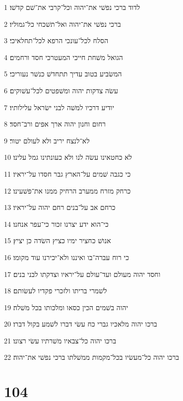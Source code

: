 \par 1 לדוד ברכי נפשׁי את־יהוה וכל־קרבי את־שׁם קדשׁו׃
\par 2 ברכי נפשׁי את־יהוה ואל־תשׁכחי כל־גמוליו׃
\par 3 הסלח לכל־עונכי הרפא לכל־תחלאיכי׃
\par 4 הגואל משׁחת חייכי המעטרכי חסד ורחמים׃
\par 5 המשׂביע בטוב עדיך תתחדשׁ כנשׁר נעוריכי׃
\par 6 עשׂה צדקות יהוה ומשׁפטים לכל־עשׁוקים׃
\par 7 יודיע דרכיו למשׁה לבני ישׂראל עלילותיו׃
\par 8 רחום וחנון יהוה ארך אפים ורב־חסד׃
\par 9 לא־לנצח יריב ולא לעולם יטור׃
\par 10 לא כחטאינו עשׂה לנו ולא כעונתינו גמל עלינו׃
\par 11 כי כגבה שׁמים על־הארץ גבר חסדו על־יראיו׃
\par 12 כרחק מזרח ממערב הרחיק ממנו את־פשׁעינו׃
\par 13 כרחם אב על־בנים רחם יהוה על־יראיו׃
\par 14 כי־הוא ידע יצרנו זכור כי־עפר אנחנו׃
\par 15 אנושׁ כחציר ימיו כציץ השׂדה כן יציץ׃
\par 16 כי רוח עברה־בו ואיננו ולא־יכירנו עוד מקומו׃
\par 17 וחסד יהוה מעולם ועד־עולם על־יראיו וצדקתו לבני בנים׃
\par 18 לשׁמרי בריתו ולזכרי פקדיו לעשׂותם׃
\par 19 יהוה בשׁמים הכין כסאו ומלכותו בכל משׁלה׃
\par 20 ברכו יהוה מלאכיו גברי כח עשׂי דברו לשׁמע בקול דברו׃
\par 21 ברכו יהוה כל־צבאיו משׁרתיו עשׂי רצונו׃
\par 22 ברכו יהוה כל־מעשׂיו בכל־מקמות ממשׁלתו ברכי נפשׁי את־יהוה׃

\chapter{104}

